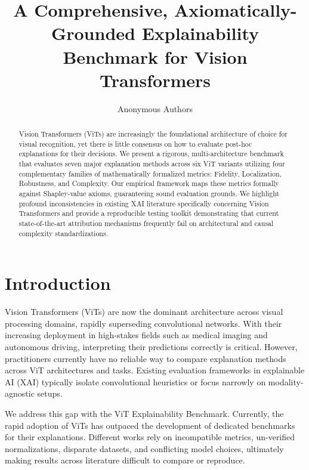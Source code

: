 \documentclass[10pt,journal,compsoc]{IEEEtran}
\begin{document}
\title{A Comprehensive, Axiomatically-Grounded Explainability Benchmark for Vision Transformers}
\author{Anonymous Authors}

\maketitle

\begin{abstract}
Vision Transformers (ViTs) are increasingly the foundational architecture of choice for visual recognition, yet there is little consensus on how to evaluate post-hoc explanations for their decisions. We present a rigorous, multi-architecture benchmark that evaluates seven major explanation methods across six ViT variants utilizing four complementary families of mathematically formalized metrics: Fidelity, Localization, Robustness, and Complexity. Our empirical framework maps these metrics formally against Shapley-value axioms, guaranteeing sound evaluation grounds. We highlight profound inconsistencies in existing XAI literature specifically concerning Vision Transformers and provide a reproducible testing toolkit demonstrating that current state-of-the-art attribution mechanisms frequently fail on architectural and causal complexity standardizations. 
\end{abstract}

\section{Introduction}
\label{sec:intro}
Vision Transformers (ViTs) are now the dominant architecture across visual processing domains, rapidly superseding convolutional networks. With their increasing deployment in high-stakes fields such as medical imaging and autonomous driving, interpreting their predictions correctly is critical. However, practitioners currently have no reliable way to compare explanation methods across ViT architectures and tasks. Existing evaluation frameworks in explainable AI (XAI) typically isolate convolutional heuristics or focus narrowly on modality-agnostic setups.

We address this gap with the ViT Explainability Benchmark. Currently, the rapid adoption of ViTs has outpaced the development of dedicated benchmarks for their explanations. Different works rely on incompatible metrics, un-verified normalizations, disparate datasets, and conflicting model choices, ultimately making results across literature difficult to compare or reproduce.
\end{document}
